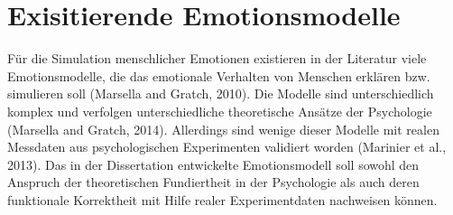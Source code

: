 \chapter{Exisitierende Emotionsmodelle}

Für die Simulation menschlicher Emotionen existieren in der Literatur viele Emotionsmodelle, die das
emotionale Verhalten von Menschen erklären bzw. simulieren soll (Marsella and Gratch, 2010). Die
Modelle sind unterschiedlich komplex und verfolgen unterschiedliche theoretische Ansätze der
Psychologie (Marsella and Gratch, 2014). Allerdings sind wenige dieser Modelle mit realen Messdaten
aus psychologischen Experimenten validiert worden (Marinier et al., 2013). Das in der Dissertation
entwickelte Emotionsmodell soll sowohl den Anspruch der theoretischen Fundiertheit in der
Psychologie als auch deren funktionale Korrektheit mit Hilfe realer Experimentdaten nachweisen
können.
